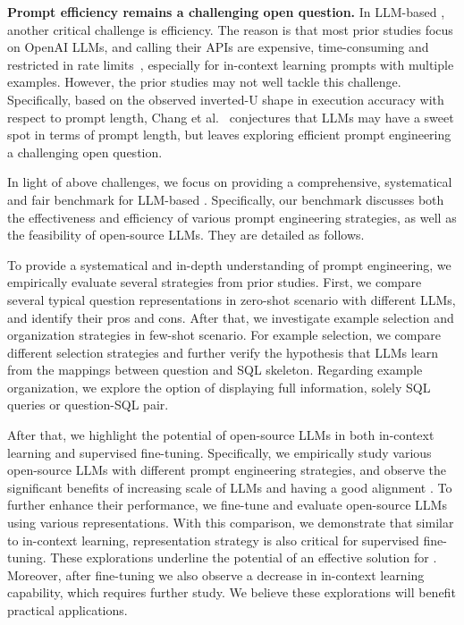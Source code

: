 \textbf{Prompt efficiency remains a challenging open question.} 
In LLM-based \nlsql, another critical challenge is efficiency. 
The reason is that most prior studies focus on OpenAI LLMs, and calling their APIs are expensive, time-consuming and restricted in rate limits~\cite{ratelimites}, especially for in-context learning prompts with multiple examples. 
However, the prior studies may not well tackle this challenge. 
Specifically, based on the observed inverted-U shape in execution accuracy with respect to prompt length, Chang et al.~\cite{DBLP:journals/corr/abs-2305-11853} conjectures that LLMs may have a sweet spot in terms of prompt length, but leaves exploring efficient prompt engineering a challenging open question. 

In light of above challenges, we focus on providing a comprehensive, systematical and fair benchmark for LLM-based \nlsql. 
Specifically, our benchmark discusses both the effectiveness and efficiency of various prompt engineering strategies, as well as the feasibility of open-source LLMs.
They are detailed as follows.

To provide a systematical and in-depth understanding of \nlsql prompt engineering, we empirically evaluate several strategies from prior studies. 
First, we compare several typical question representations in zero-shot scenario with different LLMs, and identify their pros and cons.
After that, we investigate example selection and organization strategies in few-shot scenario. 
For example selection, we compare different selection strategies and further verify the hypothesis that LLMs learn from the mappings between question and SQL skeleton. 
Regarding example organization, we explore the option of displaying full information, solely SQL queries or question-SQL pair. 

After that, we highlight the potential of open-source LLMs in both in-context learning and supervised fine-tuning. 
Specifically, we empirically study various open-source LLMs with different prompt engineering strategies, and observe the significant benefits of increasing scale of LLMs and having a good alignment \cite{instructgpt}. 
To further enhance their performance, we fine-tune and evaluate open-source LLMs using various representations. 
With this comparison, we demonstrate that similar to in-context learning, representation strategy is also critical for supervised fine-tuning. 
These explorations underline the potential of an effective solution for \nlsql.
Moreover, after fine-tuning we also observe a decrease in in-context learning capability, which requires further study. 
We believe these explorations will benefit practical \nlsql applications.

